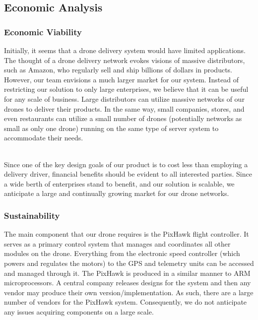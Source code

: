 \documentclass[12pt]{extarticle}
\begin{document}
\subsection{Economic Analysis}

\subsubsection{Economic Viability}

Initially, it seems that a drone delivery system would have limited applications.  The thought of a drone delivery network evokes visions of massive distributors, such as Amazon, who regularly sell and ship billions of dollars in products.  However, our team envisions a much larger market for our system.  Instead of restricting our solution to only large enterprises, we believe that it can be useful for any scale of business.  Large distributors can utilize massive networks of our drones to deliver their products.  In the same way, small companies, stores, and even restaurants can utilize a small number of drones (potentially networks as small as only one drone) running on the same type of server system to accommodate their needs.  

\ \\
Since one of the key design goals of our product is to cost less than employing a delivery driver, financial benefits should be evident to all interested parties.  Since a wide berth of enterprises stand to benefit, and our solution is scalable, we anticipate a large and continually growing market for our drone networks.  



\subsubsection{Sustainability}

The main component that our drone requires is the PixHawk flight controller.  It serves as a primary control system that manages and coordinates all other modules on the drone.  Everything from the electronic speed controller (which powers and regulates the motors) to the GPS and telemetry units can be accessed and managed through it.  The PixHawk is produced in a similar manner to ARM microprocessors.  A central company releases designs for the system and then any vendor may produce their own version/implementation.  As such, there are a large number of vendors for the PixHawk system.  Consequently, we do not anticipate any issues acquiring components on a large scale.  
\end{document}
